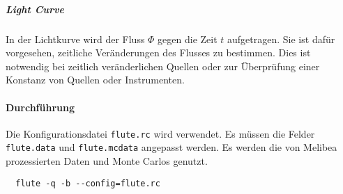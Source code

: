 \subparagraph{Light Curve}
In der Lichtkurve wird
der Fluss $\Phi$ gegen die Zeit $t$
aufgetragen.
Sie ist dafür vorgesehen,
zeitliche Veränderungen des Flusses zu bestimmen.
Dies ist notwendig bei zeitlich veränderlichen Quellen
oder zur Überprüfung einer Konstanz von Quellen oder Instrumenten.



\paragraph{Durchführung}%

Die Konfigurationsdatei \texttt{flute.rc} wird verwendet.
Es müssen die Felder \texttt{flute.data} und \texttt{flute.mcdata} angepasst werden.
Es werden die von Melibea prozessierten Daten und Monte Carlos genutzt.


\begin{lstlisting}
  flute -q -b --config=flute.rc
\end{lstlisting}
